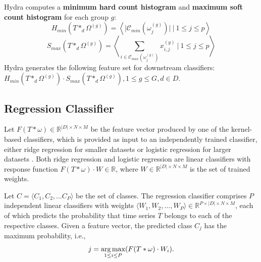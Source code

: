 Hydra computes a \textbf{minimum hard count histogram} and \textbf{maximum soft count histogram} for each group $g$:
\begin{equation}
    H_{min}(T *_d \Omega^{(g)}) = \left\langle \biggl|\mathcal{C}_{min}(\omega_j^{(g)})\biggr|\ |\ 1 \leq j \leq p \right\rangle 
    \label{eq:Hmin}
\end{equation}
\begin{equation}
    S_{max}(T *_d \Omega^{(g)}) = \left\langle \sum_{i\in \mathcal{C}_{max}(\omega_j^{(g)})}x_{i,j}^{(g)}\ |\ 1 \leq j \leq p \right\rangle
    \label{eq:Smax}
\end{equation}
Hydra generates the following feature set for downstream classifiers: 
$H_{min}(T *_d \Omega^{(g)}) \cdot S_{max}(T *_d \Omega^{(g)}), 1 \leq g \leq G, d \in D$.

\subsection{Regression Classifier}
\label{sec:regression}

Let $F(T*\omega) \in \mathbb{R}^{\left|D\right| \times N \times M}$ be the feature vector produced by one of the kernel-based classifiers, which is provided as input to an independently trained classifier, either ridge regression for smaller datasets or logistic regression for larger datasets \cite{Rocket}. Both ridge regression and logistic regression are linear classifiers with response function 
$F(T*\omega)\cdot W \in \mathbb{R}$, where $W \in \mathbb{R}^{\left|D\right| \times N \times M}$ is the set of trained weights. 

Let $C = \langle C_1, C_2, \ldots C_P\rangle$ be the set of classes. The regression classifier comprises $P$ independent linear classifiers with weights $\langle W_1, W_2, \ldots, W_P \rangle \in \mathbb{R}^{P\times\left|D\right| \times N \times M}$, each of which predicts the probability that time series $T$ belongs to each of the respective classes. Given a feature vector, the predicted class $C_j$ has the maximum probability, i.e.,
\begin{equation}
    j = \operatorname*{arg\,max}\limits_{1 \leq i \leq P}(F(T*\omega)\cdot W_i). 
    \label{eq:predicted_class}
\end{equation}



